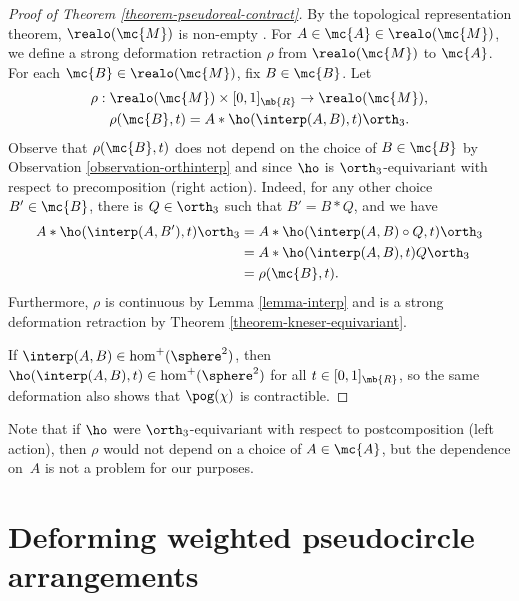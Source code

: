 
\begin{proof}[Proof of Theorem \ref{theorem-pseudoreal-contract}]
By the topological representation theorem, $\realo(\mc{M})$ is non-empty \cite{folkman1978oriented}.
For $A \in \mc{A} \in \realo(\mc{M})$, we define a strong deformation retraction $\rho$ from $\realo(\mc{M})$ to $\mc{A}$.
For each $\mc{B} \in \realo(\mc{M})$, fix $B \in \mc{B}$. Let
\begin{gather*}
\rho : \realo(\mc{M}) \times [0,1]_\mb{R} \to \realo(\mc{M}),\\\rho(\mc{B},t) = A*\ho(\interp(A,B),t)\orth_3.
\end{gather*}
Observe that $\rho(\mc{B},t)$ does not depend on the choice of $B \in \mc{B}$ by Observation \ref{observation-orthinterp} and since $\ho$ is $\orth_3$-equivariant with respect to precomposition (right action). Indeed, for any other choice $B' \in \mc{B}$, there is $Q \in \orth_3$ such that $B' = B*Q$, and we have
\begin{align*}
A*\ho(\interp(A,B'),t)\orth_3
&= A*\ho(\interp(A,B) \circ Q,t)\orth_3 \\
&= A*\ho(\interp(A,B),t)Q\orth_3 \\
&= \rho(\mc{B},t).
\end{align*}
Furthermore, $\rho$ is continuous by Lemma \ref{lemma-interp} and is a strong deformation retraction by Theorem \ref{theorem-kneser-equivariant}.

If $\interp(A,B) \in \hom^+(\sphere^2)$, then $\ho(\interp(A,B),t) \in \hom^+(\sphere^2)$ for all $t \in [0,1]_\mb{R}$,
so the same deformation also shows that $\pog(\chi)$ is contractible.
\end{proof}

\begin{remark}
Note that if $\ho$ were $\orth_3$-equivariant with respect to postcomposition (left action), then $\rho$ would not depend on a choice of $A \in \mc{A}$, but the dependence on~$A$ is not a problem for our purposes.
\end{remark}

\section{Deforming weighted pseudocircle arrangements}\label{section-deforming}

